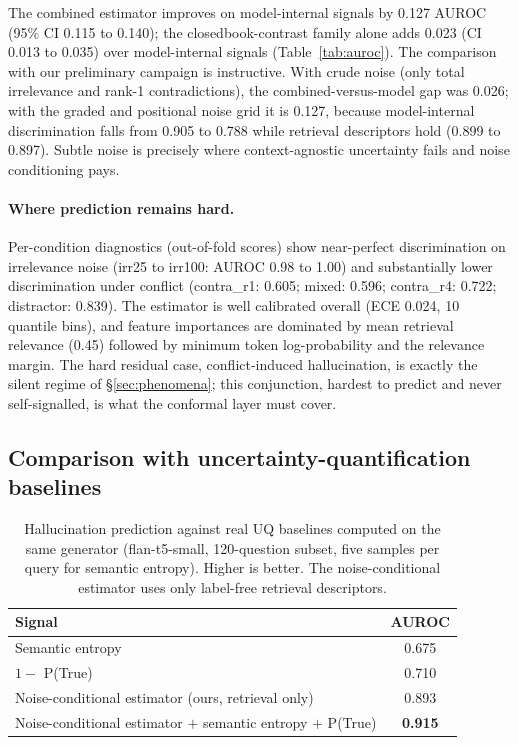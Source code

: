 \documentclass[11pt]{article}
\begin{document}
The combined estimator improves on model-internal signals by 0.127
AUROC (95\% CI 0.115 to 0.140); the closedbook-contrast family alone
adds 0.023 (CI 0.013 to 0.035) over model-internal signals
(Table~\ref{tab:auroc}). The comparison with our preliminary campaign
is instructive. With crude noise (only total irrelevance and rank-1
contradictions), the combined-versus-model gap was 0.026; with the
graded and positional noise grid it is 0.127, because model-internal
discrimination falls from 0.905 to 0.788 while retrieval descriptors
hold (0.899 to 0.897). Subtle noise is precisely where context-agnostic
uncertainty fails and noise conditioning pays.

\paragraph{Where prediction remains hard.}
Per-condition diagnostics (out-of-fold scores) show near-perfect
discrimination on irrelevance noise (irr25 to irr100: AUROC 0.98 to
1.00) and substantially lower discrimination under conflict
(contra\_r1: 0.605; mixed: 0.596; contra\_r4: 0.722; distractor:
0.839). The estimator is well calibrated overall (ECE 0.024, 10
quantile bins), and feature importances are dominated by mean retrieval
relevance (0.45) followed by minimum token log-probability and the
relevance margin. The hard residual case, conflict-induced
hallucination, is exactly the silent regime of
\S\ref{sec:phenomena}; this conjunction, hardest to predict and never
self-signalled, is what the conformal layer must cover.

\subsection{Comparison with uncertainty-quantification baselines}
\label{sec:baselines}

\begin{table}[tbp]
\centering\small
\caption{Hallucination prediction against real UQ baselines computed on the
same generator (flan-t5-small, 120-question subset, five samples per query
for semantic entropy). Higher is better. The noise-conditional estimator
uses only label-free retrieval descriptors.}
\label{tab:baselines}
\begin{tabular}{lc}
\toprule
Signal & AUROC \\
\midrule
Semantic entropy \citep{kuhn2023semantic,farquhar2024nature} & 0.675 \\
$1 - $ P(True) \citep{kadavath2022language}                      & 0.710 \\
Noise-conditional estimator (ours, retrieval only)           & 0.893 \\
Noise-conditional estimator $+$ semantic entropy $+$ P(True) & \textbf{0.915} \\
\bottomrule
\end{tabular}
\end{table}
\end{document}

